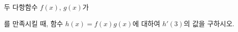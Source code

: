 두 다항함수 $f(x)$, $g(x)$가 \par\smallskip{}\par\smallskip\noindent 를 만족시킬 때, 함수 $h(x)=f(x)g(x)$에 대하여 $h'(3)$의 값을 구하시오.
